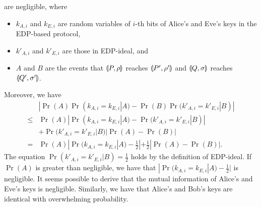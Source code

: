 are negligible, where 
\begin{itemize}
 \item $k_{A,i}$ and $k_{E,i}$ are random variables of $i$-th bits of
       Alice's and Eve's keys in the EDP-based protocol, 
 \item $k'_{A,i}$ and $k'_{E,i}$ are those in EDP-ideal, and
 \item $A$ and $B$ are the events that
       $\llparenthesis P, \rho \rrparenthesis$ reaches $\llparenthesis P', \rho' \rrparenthesis$ and
       $\llparenthesis Q, \sigma \rrparenthesis$ reaches $\llparenthesis Q', \sigma' \rrparenthesis$.
\end{itemize}
Moreover, we have
\begin{align*}
    &|\Pr(A)\Pr(k_{A,i} = k_{E,i}|A) - \Pr(B)\Pr(k'_{A,i} = k'_{E,i}|B)|\\
\le &\Pr(A)|\Pr(k_{A,i} = k_{E,i}|A) - \Pr(k'_{A,i} = k'_{E,i}|B)|\\
 &+ \Pr(k'_{A,i} = k'_{E,i}|B)|\Pr(A) - \Pr(B)|\\
= & \Pr(A)|\Pr(k_{A,i} = k_{E,i}|A) - \frac{1}{2}| + \frac{1}{2}|\Pr(A) - \Pr(B)|.
\end{align*}
The equation $\Pr(k'_{A,i} = k'_{E,i}|B) = \frac{1}{2}$ holds by the
definition
of EDP-ideal. If $\Pr(A)$ is greater than negligible, we have
that $|\Pr(k_{A,i} = k_{E,i}|A) - \frac{1}{2}|$ is negligible.
It seems possible to derive that the mutual information of Alice's and
Eve's keys is negligible. Similarly, we have that Alice's and Bob's
keys are identical with overwhelming probability.

